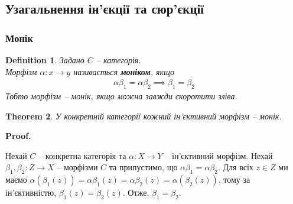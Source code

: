 \documentclass[a4paper, 10pt]{article}
\makeatletter
\theoremstyle{theoremdd}
\newtheorem{theorem}{Theorem}[subsection]
\newtheorem{definition}[theorem]{Definition}
\renewenvironment{proof}[1][Proof.\\]{\par
\pushQED{\hfill \qed}%
\normalfont \topsep6\p@\@plus6\p@\relax
\trivlist
\item\relax
{\bfseries
#1\@addpunct{.}}\hspace\labelsep\ignorespaces
}{%
\popQED\endtrivlist\@endpefalse
}
\makeatother
\begin{document}
\subsection{Узагальнення ін'єкції та сюр'єкції}
\subsubsection{Монік}
\begin{definition}
Задано $C$ -- категорія.\\
Морфізм $\alpha \colon x \to y$ називається \textbf{моніком}, якщо
\begin{align*}
\alpha \beta_1 = \alpha \beta_2 \implies \beta_1 = \beta_2
\end{align*}
Тобто морфізм -- монік, якщо можна завжди скоротити зліва.
\begin{figure}[H]
\centering
{}
\end{figure}
\end{definition}

\begin{theorem}
У конкретній категорії кожний ін'єктивний морфізм -- монік.
\end{theorem}

\begin{proof}
Нехай $C$ -- конкретна категорія та $\alpha \colon X \to Y$ -- ін'єктивний морфізм. Нехай $\beta_1, \beta_2 \colon Z \to X$ -- морфізми $C$ та припустимо, що $\alpha \beta_1 = \alpha \beta_2$. Для всіх $z \in Z$ ми маємо $\alpha(\beta_1(z)) = \alpha \beta_1 (z) = \alpha \beta_2(z) = \alpha(\beta_2(z))$, тому за ін'єктивністю, $\beta_1(z) = \beta_2(z)$. Отже, $\beta_1 = \beta_2$.
\end{proof}
\end{document}
